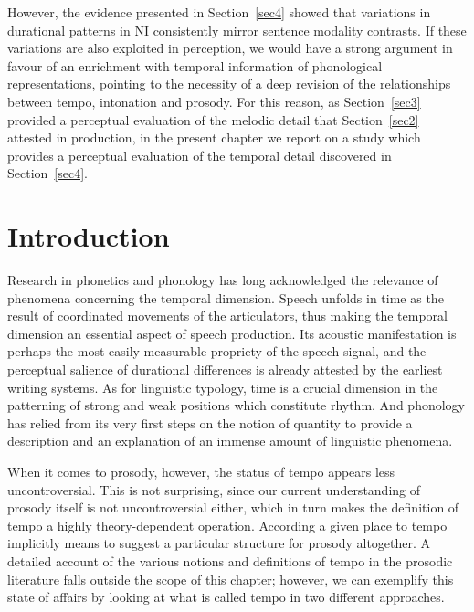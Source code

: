 However, the evidence presented in Section~\ref{sec4} showed that variations in durational patterns in NI consistently mirror sentence modality contrasts. If these variations are also exploited in perception, we would have a strong argument in favour of an enrichment with temporal information of phonological representations, pointing to the necessity of a deep revision of the relationships between tempo, intonation and prosody. For this reason, as Section~\ref{sec3} provided a perceptual evaluation of the melodic detail that Section~\ref{sec2} attested in production, in the present chapter we report on a study \citep{cangemiFORTHtempo} which provides a perceptual evaluation of the temporal detail discovered in Section~\ref{sec4}. 

\section{Introduction}\label{sec51}
Research in phonetics and phonology has long acknowledged the relevance of phenomena concerning the temporal dimension. 
Speech unfolds in time as the result of coordinated movements of the articulators, thus making the temporal dimension an essential aspect of speech production. Its acoustic manifestation is perhaps the most easily measurable propriety of the speech signal, and the perceptual salience of durational differences is already attested by the earliest writing systems. 
As for linguistic typology, time is a crucial dimension in the patterning of strong and weak positions which constitute rhythm.
And phonology has relied from its very first steps on the notion of quantity to provide a description and an explanation of an immense amount of linguistic phenomena.

When it comes to prosody, however, the status of tempo appears less uncontroversial. This is not surprising, since our current understanding of prosody itself is not uncontroversial either, which in turn makes the definition of tempo a highly theory-dependent operation. According a given place to tempo implicitly means to suggest a particular structure for prosody altogether. A detailed account of the various notions and definitions of tempo in the prosodic literature falls outside the scope of this chapter; however, we can exemplify this state of affairs by looking at what is called tempo in two different approaches. 

